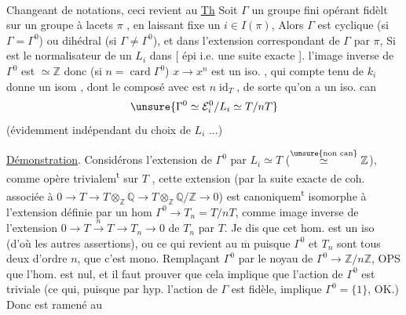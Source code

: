 Changeant de notations, ceci revient au
\uline{Th}\textsuperscript{} Soit $\Gamma$ un groupe fini opérant
fidèlt sur un groupe \uline{} à
lacets $\pi$ , en laissant fixe un $i\in I(\pi)$,
Alors $\Gamma$ est cyclique (si $\Gamma=\Gamma^0$) ou
dihédral (si $\Gamma\ne\Gamma^0$), et dans l'extension
correspondant   de $\Gamma$ par $\pi$,
Si  est le normalisateur de un $L_i$ dans
 [    épi i.e. une suite exacte
 ]. l'image inverse  de
$\Gamma^0$ est $\simeq\mathbb Z$ donc (si $n=\operatorname{card}\Gamma^0$)\inserted{\unsure{$=[\mathcal E_i^0:L_i]$}}
 $x\to x^n$ est un iso.  , qui
compte tenu de $k_i$ donne un
isom , dont le composé avec
  est $n\operatorname{id}_T$, de sorte
qu'on a un iso. can
\[\unsure{\Gamma^0\simeq\mathcal E_i^0/L_i\simeq T/nT}\]
(évidemment indépendant du choix de $L_i$ ...)

\uline{Démonstration}. Considérons l'extension
 de $\Gamma^0$ par $L_i\simeq T$ ($\overset{\text{\unsure{non can}}}{\simeq}\mathbb Z$),
comme  opère trivialem\textsuperscript{t} sur $T$ , cette
extension (par la suite exacte de coh.
associée à $0\to T\to T\otimes_{\mathbb Z}\mathbb Q\to T\otimes_{\mathbb Z}\mathbb Q/\mathbb Z\to0$)
est canoniquem\textsuperscript{t} isomorphe à  l'extension
définie par un hom $\Gamma^0\to T_n=T/nT$,
comme image inverse de l'extension
$0\to T\xrightarrow{n}T\to T_n\to0$ de $T_n$ par $T$. Je dis que
cet hom. est un iso (d'où 
les autres assertions), ou ce qui revient
au $\overline{\mathrm m}$ puisque $\Gamma^0$ et $T_n$ sont tous
deux d'ordre $n$, que c'est mono.
Remplaçant $\Gamma^0$ par le noyau de $\Gamma^0\to\mathbb Z/n\mathbb Z$,
OPS que l'hom.  est nul, et il faut
prouver que cela implique que l'action
de $\Gamma^0$ est triviale (ce qui, puisque par hyp.
l'action de $\Gamma$ est fidèle, implique $\Gamma^0=\{1\}$,
OK.) Donc  est ramené au


